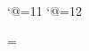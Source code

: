 
\catcode`@=11
\def\makedigitsother{\m@kedigitsother}
\def\makedigitsletters{\m@kedigitsletters}
\catcode `@=12

\def\nbsp{ }    %
\def\zwsp{​}     %
\def\zwj{‍}      %

\newdimen\remblskip \remblskip=\baselineskip
\def\suckupline{\vskip -\baselineskip}          %
\def\suckuphalfline{\vskip -0.5\baselineskip}   %
\def\suckupqline{\vskip -0.25\baselineskip}     %
\def\skipline{\vskip\baselineskip}              %
\def\skiphalfline{\vskip 0.5\baselineskip}      %
\def\skipqline{\vskip 0.25\baselineskip}        %


